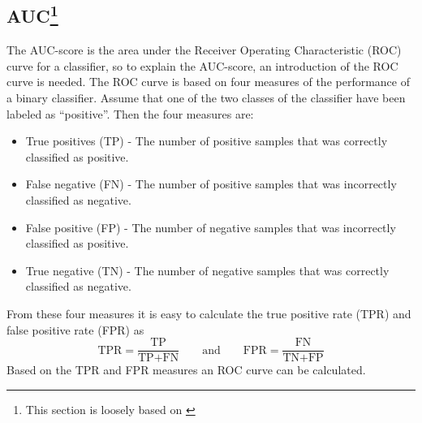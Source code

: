 \subsection[AUC]{AUC\protect\footnote{This section is loosely based on \citet[p.296-301]{kumar06}}}
The AUC-score is the area under the Receiver Operating Characteristic (ROC) curve for a classifier, so to explain the AUC-score, an introduction of the ROC curve is needed. The ROC curve is based on four measures of the performance of a binary classifier. Assume that one of the two classes of the classifier have been labeled as ``positive''. Then the four measures are:
\begin{itemize}
    \item True positives (TP) - The number of positive samples that was correctly classified as positive.
    \item False negative (FN) - The number of positive samples that was incorrectly classified as negative.
    \item False positive (FP) - The number of negative samples that was incorrectly classified as positive.
    \item True negative (TN) - The number of negative samples that was correctly classified as negative.
\end{itemize}
From these four measures it is easy to calculate the true positive rate (TPR) and false positive rate (FPR) as
\[
\text{TPR} = \frac{\text{TP}}{\text{TP}+\text{FN}}\quad\quad\text{and}\quad\quad \text{FPR} = \frac{\text{FN}}{\text{TN}+\text{FP}}
\]
Based on the TPR and FPR measures an ROC curve can be calculated.

